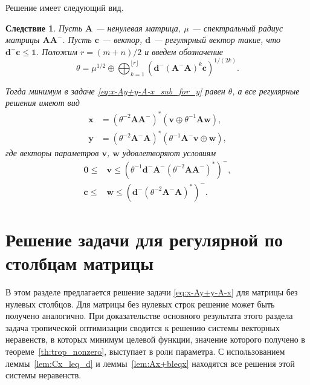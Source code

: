 \documentclass[specialist,
               substylefile = spbu.rtx,
               subf,href,colorlinks=true, 12pt]{disser}
\newtheorem{corollary}{Следствие}
\theoremstyle{definition}
\begin{document}
Решение имеет следующий вид.
\begin{corollary}\label{th:cor:trop_nonzero_sub_for_y}
Пусть $\bm{A}$ --- ненулевая матрица, $\mu$ --- спектральный радиус матрицы $\bm{A}\bm{A}^{-}$. Пусть $\bm{c}$ --- вектор, $\bm{d}$ --- регулярный вектор такие, что $\bm{d}^{-}\bm{c}\leq\mathbb{1}$.  Положим $r=(m+n)/2$ и введем обозначение
\begin{equation}\label{eq:theta_y}
\theta
=
\mu^{1/2}
\oplus
\bigoplus_{k=1}^{\lfloor r\rfloor}
\left(
\bm{d}^{-}(\bm{A}^{-}\bm{A})^{k}\bm{c}
\right)^{1/(2k)}
.
\end{equation}

Тогда минимум в задаче \eqref{eq:x-Ay+y-A-x_sub_for_y} равен $\theta$, а все регулярные решения имеют вид
\begin{align*}
\bm{x}
&=
(\theta^{-2}\bm{A}\bm{A}^{-})^{\ast}(\bm{v}\oplus\theta^{-1}\bm{A}\bm{w})
,
\\
\bm{y}
&=
(\theta^{-2}\bm{A}^{-}\bm{A})^{\ast}(\theta^{-1}\bm{A}^{-}\bm{v}\oplus\bm{w})
,
\end{align*}
где векторы параметров $\bm{v}$, $\bm{w}$ удовлетворяют условиям
\begin{align*}
\bm{0}
\leq
&\bm{v}
\leq
(\theta^{-1}\bm{d}^{-}\bm{A}^{-}(\theta^{-2}\bm{A}\bm{A}^{-})^{\ast})^{-}
,
\\
\bm{c}
\leq
&\bm{w}
\leq
(\bm{d}^{-}(\theta^{-2}\bm{A}^{-}\bm{A})^{\ast})^{-}
.
\end{align*}
\end{corollary}

\section{Решение задачи для регулярной по столбцам матрицы}\label{sec:SCRM}
В этом разделе предлагается решение задачи \eqref{eq:x-Ay+y-A-x} для матрицы без нулевых столбцов. 
Для матрицы без нулевых строк решение может быть получено аналогично. 
При доказательстве основного результата этого раздела задача тропической оптимизации сводится к решению системы векторных неравенств, 
в которых минимум целевой функции, значение которого получено в теореме~\ref{th:trop_nonzero}, выступает в роли параметра.
С использованием  леммы~\ref{lem:Cx_leq_d} и леммы~\ref{lem:Ax+bleqx} находятся все решения этой системы неравенств.
\end{document}
